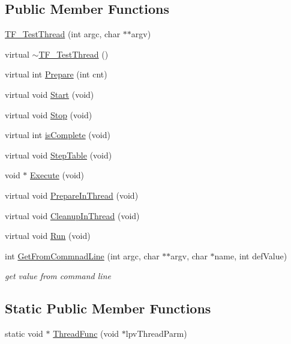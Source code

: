 \subsection*{Public Member Functions}
\begin{DoxyCompactItemize}
\item 
\hyperlink{classTF__TestThread_adc0b50667619b13b3791f96f8d9f3f9e}{TF\_\-TestThread} (int argc, char $\ast$$\ast$argv)
\item 
virtual \hyperlink{classTF__TestThread_a98193a8f032be71f6722230a528cb497}{$\sim$TF\_\-TestThread} ()
\item 
virtual int \hyperlink{classTF__TestThread_acfc9a31db91472deb811a47c1cf8e20f}{Prepare} (int cnt)
\item 
virtual void \hyperlink{classTF__TestThread_af7457803ef027ae030d7a98363b9e4b9}{Start} (void)
\item 
virtual void \hyperlink{classTF__TestThread_a3a633a8999b704e85bb197b5fdd63b43}{Stop} (void)
\item 
virtual int \hyperlink{classTF__TestThread_a323fe5eecb67f390ee0fada90ade5ed2}{isComplete} (void)
\item 
virtual void \hyperlink{classTF__TestThread_a25569ec704c682eed81abd63e05adf2a}{StepTable} (void)
\item 
void $\ast$ \hyperlink{classTF__TestThread_aac0ee4d59a3fa57e93ad2fa33644b377}{Execute} (void)
\item 
virtual void \hyperlink{classTF__TestThread_aebd5daf255a209019d018bc363021433}{PrepareInThread} (void)
\item 
virtual void \hyperlink{classTF__TestThread_a36cfb1a6da55b938b5634ac86adbae2f}{CleanupInThread} (void)
\item 
virtual void \hyperlink{classTF__TestThread_ab581c9fb725595dff5ffc400a96886a0}{Run} (void)
\item 
int \hyperlink{classTF__TestThread_a3cd8bd0134a8c180c885e7fb19cc9b3c}{GetFromCommnadLine} (int argc, char $\ast$$\ast$argv, char $\ast$name, int defValue)
\begin{DoxyCompactList}\small\item\em get value from command line \item\end{DoxyCompactList}\end{DoxyCompactItemize}
\subsection*{Static Public Member Functions}
\begin{DoxyCompactItemize}
\item 
static void $\ast$ \hyperlink{classTF__TestThread_a9ba6692148ce51f4bbfff8f408479c1f}{ThreadFunc} (void $\ast$lpvThreadParm)
\end{DoxyCompactItemize}
